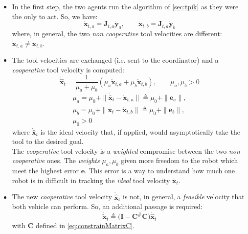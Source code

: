 \begin{itemize}
	\item In the first step, the two agents run the algorithm of \ref{sec:tpik} as they were the only to act. So, we have:
	\begin{equation}
		\dot{\boldsymbol{x}}_{t,a} = \boldsymbol{J}_{t,a} \dot{\boldsymbol{y}}_{a} , \qquad 
		\dot{\boldsymbol{x}}_{t,b} = \boldsymbol{J}_{t,a} \dot{\boldsymbol{y}}_{b}	
	\end{equation}
	where, in general, the two \textit{non cooperative} tool velocities are different: $\dot{\boldsymbol{x}}_{t,a} \neq \dot{\boldsymbol{x}}_{t,b}$.
	
	\item The tool velocities are exchanged (i.e. sent to the coordinator) and a \textit{cooperative} tool velocity is computed:
	\begin{equation}\label{eq:weightsum}
		\dot{\hat{\boldsymbol{x}}}_t = \dfrac{1}{\mu_a + \mu_b} (\mu_a \dot{\boldsymbol{x}}_{t,a}  + \mu_b \dot{\boldsymbol{x}}_{t,b}), \qquad
		\mu_a , \mu_b > 0	
	\end{equation}
    \begin{equation}
		\begin{gathered}
			\mu_a = \mu_0 + \| \dot{\bar{\boldsymbol{x}}}_t - \dot{\boldsymbol{x}}_{t,a} \| \triangleq \mu_0 + \| \boldsymbol{e}_a \|, \\
			\mu_b = \mu_0 + \| \dot{\bar{\boldsymbol{x}}}_t - \dot{\boldsymbol{x}}_{t,b} \| \triangleq \mu_0 + \| \boldsymbol{e}_b \|, \\
			\mu_0 > 0
	    \end{gathered}
	\end{equation}
	where $\dot{\boldsymbol{\bar{x}}}_t$ is the ideal velocity that, if applied, would asymptotically take the tool to the desired goal.\\
	The \textit{cooperative} tool velocity is a \textit{weighted} compromise between the two \textit{non cooperative} ones. The \textit{weights} $\mu_a, \mu_b$ given more freedom to the robot which meet the highest error $\boldsymbol{e}$. This error is a way to understand how much one robot is in difficult in tracking the \textit{ideal} tool velocity $\dot{\boldsymbol{\bar{x}}}_t$.
	
	\item The new \textit{cooperative} tool velocity $\dot{\hat{\boldsymbol{x}}}_t$ is not, in general, a \textit{feasible} velocity that both vehicle can perform. So, an additional passage is required:
	\begin{equation}
		\dot{\tilde{\boldsymbol{x}}}_t \triangleq \big( \boldsymbol{I} - \boldsymbol{C}^\# \boldsymbol{C} \big) \dot{\hat{\boldsymbol{x}}}_t
	\end{equation}
	with $\boldsymbol{C}$ defined in \eqref{eq:constrainMatrixC}.
	

\end{itemize}
